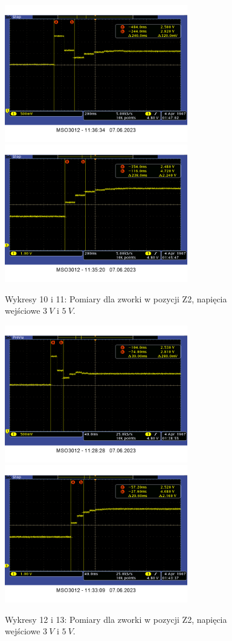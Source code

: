 \documentclass[14pt, table]{extarticle}
\begin{document}
\begin{figure}[H]
\includegraphics[width=8cm]{A14}
\includegraphics[width=8cm]{A12}
\centering
\captionsetup{labelformat=empty}
\caption{Wykresy 10 i 11: Pomiary dla zworki w pozycji Z2, napięcia wejściowe $3 \ V$ i $5 \ V$.}
\end{figure}

\begin{figure}[H]
\includegraphics[width=8cm]{A16}
\includegraphics[width=8cm]{A18}
\centering
\captionsetup{labelformat=empty}
\caption{Wykresy 12 i 13: Pomiary dla zworki w pozycji Z2, napięcia wejściowe $3 \ V$ i $5 \ V$.}
\end{figure}
\end{document}
